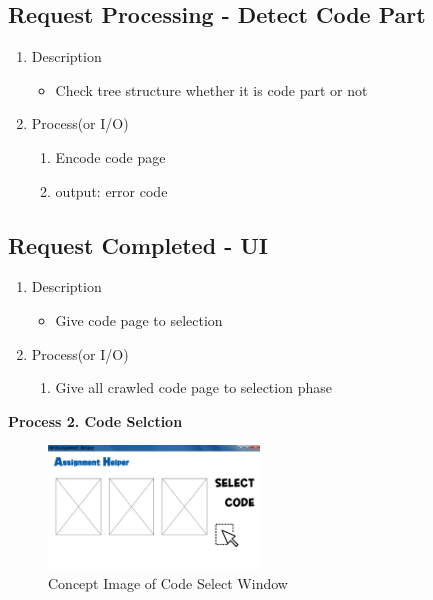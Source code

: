 \documentclass[conference]{IEEEtran}
\begin{document}
\begin{itemize}
\begin{itemize}
\begin{itemize}
\begin{itemize}
\subsection{Request Processing - Detect Code Part}
\begin{enumerate}
\item Description
  \begin{itemize}
    \item Check tree structure whether it is code part or not
  \end{itemize}
  \item Process(or I/O)
  \begin{enumerate}
    \item Encode code page
    \item output: error code
  \end{enumerate}
\end{enumerate}
\textit{}


\subsection{Request Completed - UI}
\begin{enumerate}
  \item Description
  \begin{itemize}
    \item Give code page to selection
  \end{itemize}
  \item Process(or I/O)
  \begin{enumerate}
    \item Give all crawled code page to selection phase
  \end{enumerate}
\end{enumerate}

\textit{}

\textbf{Process 2. Code Selction}


\textit{}
\begin{figure}[ht]
\centering
\includegraphics[width=0.5\textwidth]{./figures/UI_code_select.jpg}
\caption{Concept Image of Code Select Window}
\label{fig_concept_code_select}
\end{figure}



\end{itemize}
\end{itemize}
\end{itemize}
\end{itemize}
\end{document}
